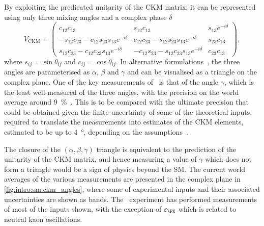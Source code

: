 By exploiting the predicated unitarity of the \ac{CKM} matrix, it can be 
represented using only three mixing angles and a complex phase $\delta$
\begin{equation}
  V_{\textrm{CKM}} =
  \begin{pmatrix}
    c_{12}c_{13} & s_{12}c_{13} & s_{13}e^{-i\delta} \\
    -s_{12}c_{23} - c_{12}s_{23}s_{13}e^{-i\delta} & c_{12}c_{23} - 
    s_{12}s_{23}s_{13}e^{-i\delta} & s_{23}c_{13} \\
    s_{12}c_{23} - c_{12}c_{23}s_{13}e^{-i\delta} & -c_{12}s_{23} - 
    s_{12}c_{23}s_{13}e^{-i\delta} & c_{23}c_{13}
  \end{pmatrix},
\end{equation}
where $s_{ij} = \sin{\theta_{ij}}$ and $c_{ij} = \cos{\theta_{ij}}$.
In alternative formulations~\cite{Wolfenstein:1983yz}, the three angles are 
parameterised as $\alpha$, $\beta$ and $\gamma$ and can be visualised as a 
triangle on the complex plane.
One of the key measurements of \lhcb\ is that of the angle $\gamma$, which is 
the least well-measured of the three angles, with the precision on the world 
average around \SI{9}{\percent}~\cite{LHCb-CONF-2016-001}.
This is to be compared with the ultimate precision that could be obtained given
the finite uncertainty of some of the theoretical inputs, required to translate
the measurements into estimates of the CKM elements, estimated to be up to 
\SI{4}{\degree}, depending on the assumptions~\cite{Brod:2013sga,Brod:2014bfa}.

The closure of the $(\alpha, \beta, \gamma)$ triangle is equivalent to the 
prediction of the unitarity of the CKM matrix, and hence measuring a value of 
$\gamma$ which does not form a triangle would be a sign of physics beyond the 
\ac{SM}.
The current world averages of the various measurements are presented in the 
complex plane in \cref{fig:intro:sm:ckm_angles}, where some of experimental 
inputs and their associated uncertainties are shown as bands.
The \lhcb\ experiment has performed measurements of most of the inputs shown, 
with the exception of $\varepsilon_{\PK}$ which is related to neutral kaon 
oscillations.

